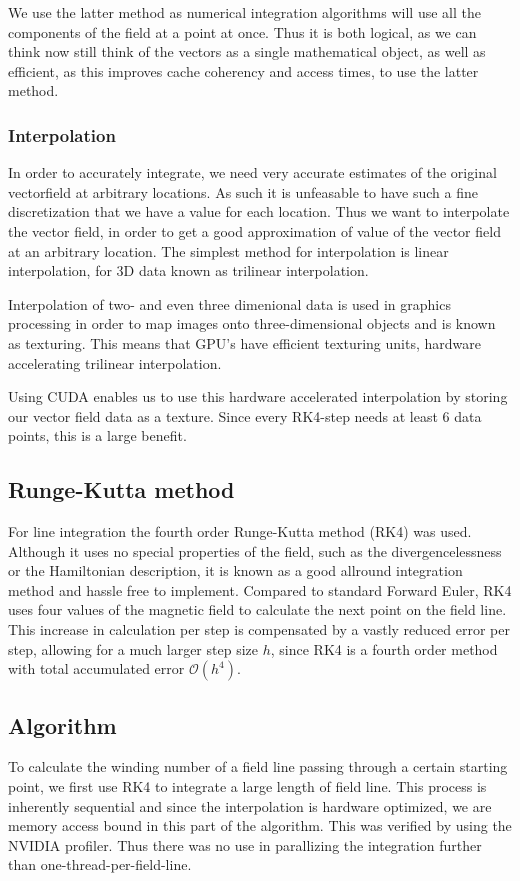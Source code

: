 \documentclass{article}
\renewcommand{\O}[1]{\ensuremath{\mathcal{O}\left(#1\right)}}
\begin{document}
We use the latter method as numerical integration algorithms will use all the components of the field at a point at once. %
Thus it is both logical, as we can think now still think of the vectors as a single mathematical object, as well as efficient, as this improves cache coherency and access times, to use the latter method.

\subsubsection{Interpolation}
In order to accurately integrate, we need very accurate estimates of the original vectorfield at arbitrary locations. As such it is unfeasable to have such a fine discretization that we have a value for each location. 
Thus we want to interpolate the vector field, in order to get a good approximation of value of the vector field at an arbitrary location. The simplest method for interpolation is linear interpolation, for 3D data known as trilinear interpolation.

Interpolation of two- and even three dimenional data is used in graphics processing in order to map images onto three-dimensional objects and is known as texturing. This means that GPU's have efficient texturing units, hardware accelerating trilinear interpolation. 

Using CUDA enables us to use this hardware accelerated interpolation by storing our vector field data as a texture. Since every RK4-step needs at least 6 data points, this is a large benefit. %
\subsection{Runge-Kutta method}
For line integration the fourth order Runge-Kutta method (RK4) was used. Although it uses no special properties of the field, such as the divergencelessness or the Hamiltonian description, it is known as a good allround integration method and hassle free to implement. 
Compared to standard Forward Euler, RK4 uses four values of the magnetic field to calculate the next point on the field line. This increase in calculation per step is compensated by a vastly reduced error per step, allowing for a much larger step size $h$, since RK4 is a fourth order method with total accumulated error $\O{h^4}$.
\subsection{Algorithm}
To calculate the winding number of a field line passing through a certain starting point, we first use RK4 to integrate a large length of field line. This process is inherently sequential and since the interpolation is hardware optimized, we are memory access bound in this part of the algorithm. This was verified by using the NVIDIA profiler. Thus there was no use in parallizing the integration further than one-thread-per-field-line.
\end{document}
